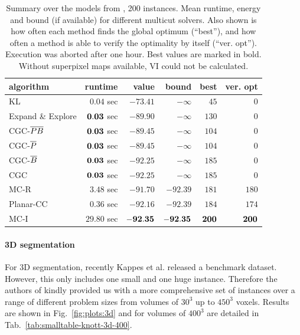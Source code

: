 \begin{table}
\centering
\scriptsize
\label{tab:experiments-yarkony-2d-2d}
\begin{tabular}{lrrrrr}
\toprule
           algorithm &         runtime       &           value &           bound &       best &   ver. opt   \\ \midrule 
                  KL & $         0.04$ sec & $       -73.41$ & $      -\infty$ & $      45$ & $       0$ \\
    Expand \& Explore & $    {\bf0.03}$ sec & $       -89.90$ & $      -\infty$ & $     130$ & $       0$ \\ 
       CGC-${\overline{PB}}$ & $   {\bf0.03}$ sec & $       -89.45$ & $      -\infty$ & $     104$ & $       0$ \\ 
        CGC-${\overline{P}}$ & $   {\bf0.03}$ sec & $       -89.45$ & $      -\infty$ & $     104$ & $      0$ \\ 
        CGC-${\overline{B}}$ & $   {\bf0.03}$ sec & $       -92.25$ & $      -\infty$ & $     185$ & $       0$ \\ 
       CGC           & $     {\bf0.03}$ sec & $       -92.25$ & $      -\infty$ & $     185$ & $       0$ \\ 
\cmidrule{1-1} 
                MC-R & $         3.48$ sec & $       -91.70$ & $       -92.39$ & $     181$ & $     180$ \\
           Planar-CC & $         0.36$ sec & $       -92.16$ & $       -92.39$ & $     184$ & $     174$ \\  
\cmidrule{1-1} 
                MC-I & $        29.80$ sec & $       {\bf-92.35}$ & $       \bf{-92.35}$ & $     {\bf200}$ & $     {\bf200}$ \\ 

\bottomrule
\end{tabular}
\caption{
Summary over the models from \cite{yarkony_2012_eccv},
200 instances. 
Mean runtime, energy and bound (if available) for different multicut solvers.
Also shown is how often each method finds the global optimum (``best''),
and how often a method is able to verify the optimality by itself
(``ver. opt'').
Execution was aborted after one hour.
Best values are marked in bold.
Without superpixel maps available, VI could not be
calculated.
}
\end{table}


\paragraph{3D segmentation}
For 3D segmentation, recently Kappes et al.
\cite{kappes_2013_benchmark_cvpr} released a benchmark dataset. However,
this only includes one small and one huge instance. Therefore
the authors of \cite{kroeger_2012_eccv} kindly provided us
with a more comprehensive set of instances
over a range of different problem sizes from volumes of $30^3$ up to 
$450^3$ voxels.
%
Results are shown
in Fig.~\ref{fig:plots:3d}
and for volumes of $400^3$ are detailed in 
Tab.~\ref{tab:smalltable-knott-3d-400}.

